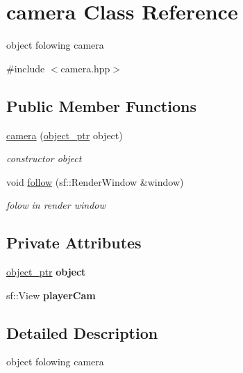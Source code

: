 \hypertarget{classcamera}{}\section{camera Class Reference}
\label{classcamera}


object folowing camera  




{\ttfamily \#include $<$camera.\+hpp$>$}

\subsection*{Public Member Functions}
\begin{DoxyCompactItemize}
\item 
\hyperlink{classcamera_ac3c67027b5f4f19c6f12db7d909930b5}{camera} (\hyperlink{drawable_8hpp_aab5add95f06d2ba25dbfed8eb07274fa}{object\+\_\+ptr} object)
\begin{DoxyCompactList}\small\item\em constructor object \end{DoxyCompactList}\item 
void \hyperlink{classcamera_a1bb99501ba67453e0ca86f3c8aef5cb1}{follow} (sf\+::\+Render\+Window \&window)
\begin{DoxyCompactList}\small\item\em folow in render window \end{DoxyCompactList}\end{DoxyCompactItemize}
\subsection*{Private Attributes}
\begin{DoxyCompactItemize}
\item 
\mbox{\label{classcamera_a2f634677bff4e01829c2b7023e302d5b}} 
\hyperlink{drawable_8hpp_aab5add95f06d2ba25dbfed8eb07274fa}{object\+\_\+ptr} {\bfseries object}
\item 
\mbox{\label{classcamera_a1ecd39044bc4cfde95854bb5c3390440}} 
sf\+::\+View {\bfseries player\+Cam}
\end{DoxyCompactItemize}


\subsection{Detailed Description}
object folowing camera 

